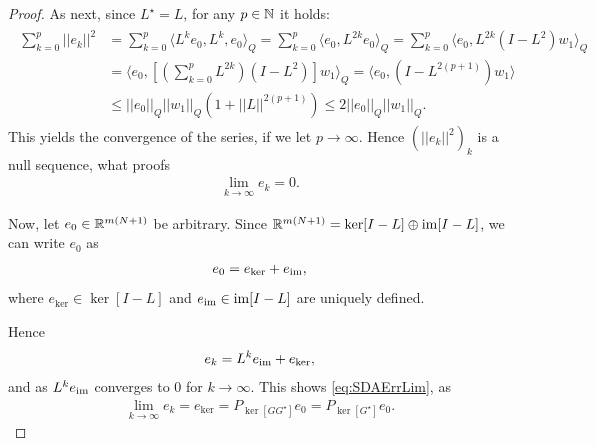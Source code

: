 \begin{proof}
%	 
	
	As next, since $L^\star = L$, for any $p \in {\mathbb{N}}$ it holds: 
	\begin{align}
\begin{split}
	\sum_{k = 0}^p ||e_k||^2 &= \sum_{k = 0}^p \langle L^k e_0, L^k, e_0  \rangle_Q = \sum_{k = 0}^p\langle e_0 , L^{2k}e_0\rangle_Q = \sum_{k = 0}^p \langle e_0, L^{2k} (I - L^2) w_1 \rangle_Q \\
	&= \langle e_0, \left[\left(\sum_{k = 0}^p L^{2k}\right) (I - L^2)\right]w_1\rangle_Q = \langle e_0 , \left( I - L^{2(p+1)}\right)w_1\rangle \\
	&\leq ||e_0||_Q ||w_1||_Q \left(1 + ||L||^{2(p+1)}\right) \leq 2 ||e_0||_Q ||w_1||_Q.
\end{split}	\end{align}
This yields the convergence of the series, if we let  $p \to \infty$. Hence $\left(||e_k||^2\right)_k$ is a null sequence, what proofs  
	\begin{align}
	\lim_{k \to \infty}e_k = 0.
	\end{align}
	
	Now, let $e_0 \in {\mathbb{R}}^{m(N+1)}$ be arbitrary. Since ${\mathbb{R}}^{m ( N+1)} = \ker [I - L] \oplus \operatorname{im} [I - L]$, we can write $e_0$ as 
	\begin{align}
	e_0 = e_{\ker} + e_{\operatorname{im}},
	\end{align}
	where $e_{\ker} \in \ker [I - L]$ and $e_{\operatorname{im}} \in \operatorname{im} [I - L]$ are uniquely defined.
	
	Hence 
	\begin{align}
	e_k = L^ke_{\operatorname{im}} + e_{\ker},
	\end{align}
	and as $L^ke_{\operatorname{im}}$ converges to 0 for $k \to \infty$.
	This shows \eqref{eq:SDAErrLim}, as  
	\begin{align}
	\lim_{k \to \infty} e_k = e_{\ker} = P_{\ker[GG^\star]}e_0 = P_{\ker[G^\star]}e_0.
	\end{align}	
\end{proof}

